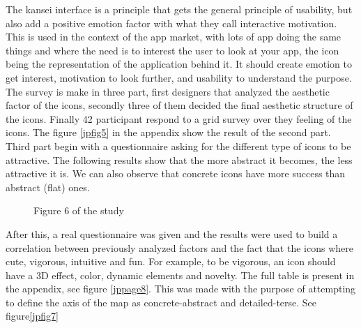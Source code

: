 \documentclass[a4paper,11pt] {article}
\theoremstyle{definition}
\begin{document}
    The kansei interface is a principle that gets the general principle of usability, but also add a positive emotion factor with what they call interactive motivation. This is used in the context of the app market, with lots of app doing the same things and where the need is to interest the user to look at your app, the icon being the representation of the application behind it. It should create emotion to get interest, motivation to look further, and usability to understand the purpose.\\

    The survey is make in three part, first designers that analyzed the aesthetic factor of the icons, secondly three of them decided the final aesthetic structure of the icons. Finally 42 participant respond to a grid survey over they feeling of the icons. The figure \ref{jpfig5} in the appendix show the result of the second part.\\

    Third part begin with a questionnaire asking for the different type of icons to be attractive. The following results show that the more abstract it becomes, the less attractive it is. We can also observe that concrete icons have more success than abstract (flat) ones.

    \begin{figure}[H]
      \caption{Figure 6 of the study \label{jpfig6}}
    \end{figure}

    After this, a real questionnaire was given and the results were used to build a correlation between previously analyzed factors and the fact that the icons where cute, vigorous, intuitive and fun. For example, to be vigorous, an icon should have a 3D effect, color, dynamic elements and novelty. The full table is present in the appendix, see figure \ref{jppage8}. This was made with the purpose of attempting to define the axis of the map as concrete-abstract and detailed-terse. See figure\ref{jpfig7}\\
\end{document}
